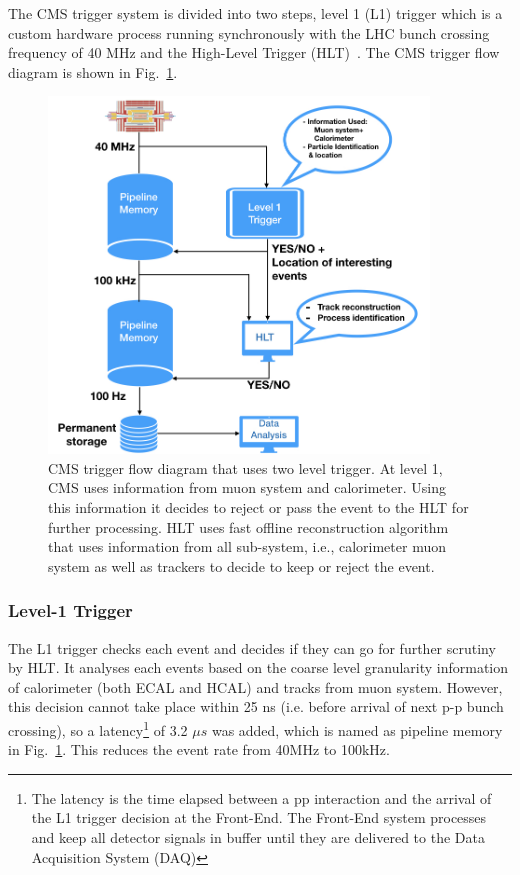 The CMS trigger system is divided into two steps, level 1 (L1) trigger which is a custom hardware process running synchronously with the LHC bunch crossing frequency of 40 MHz and the High-Level Trigger (HLT)~\cite{paper:JINST:CMSCollaboration,Cittolin:578006,Khachatryan2017}. The CMS trigger flow diagram is shown in Fig.~\ref{fig:cms-trigger}. 
\begin{figure}[!htbp]
	\centering
	\includegraphics[width=0.90\textwidth,height=0.63\textwidth]{figures/LHC/Trigger-flow-diagram.jpeg}
	\caption{CMS trigger flow diagram that uses two level trigger. At level 1, CMS uses information from muon system and calorimeter. Using this information it decides to reject  or pass the event to the HLT for further processing. HLT uses fast offline reconstruction algorithm that uses information from all sub-system, i.e., calorimeter muon system as well as trackers to decide to keep or reject the event.}
	\label{fig:cms-trigger}
\end{figure}

\subsubsection{Level-1 Trigger} %
\label{ssub:level_1_trigger}
The L1 trigger checks each event and decides if they can go for further scrutiny by HLT. It analyses each events based on the coarse level granularity information of calorimeter (both ECAL and HCAL) and tracks from muon system. However, this decision cannot take place within 25 ns (i.e. before arrival of next p-p bunch crossing), so a latency\footnote{The latency is the time elapsed between a pp interaction and the arrival of the L1 trigger decision at the Front-End. The Front-End system processes and keep all detector signals in buffer until they are delivered to the Data Acquisition System (DAQ)} of 3.2 $\mu s$ was added, which is named as pipeline memory in Fig.~\ref{fig:cms-trigger}. This reduces the event rate from 40MHz to 100kHz.

